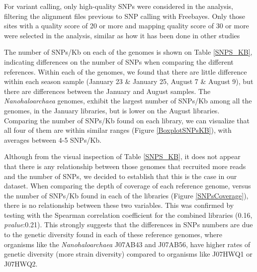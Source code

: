For variant calling, only high-quality SNPs were considered in the analysis, filtering the alignment files previous to SNP calling with Freebayes. Only those sites with a quality score of 20 or more and mapping quality score of 30 or more were selected in the analysis, similar as how it has been done in other studies \cite{Schloissnig:2012hx}

The number of SNPs/Kb on each of the genomes is shown on Table \ref{SNPS_KB}, indicating differences on the number of SNPs when comparing the different references. Within each of the genomes, we found that there are little difference within each season sample (January 23 \& January 25, August 7 \& August 9), but there are differences between the January and August samples. The \textit{Nanohaloarchaea} genomes, exhibit the largest number of SNPs/Kb among all the genomes, in the January libraries, but is lower on the August libraries. Comparing the number of SNPs/Kb found on each library, we can visualize that all four of them are within similar ranges (Figure \ref{BoxplotSNPsKB}), with averages between 4-5 SNPs/Kb.

Although from the visual inspection of Table \ref{SNPS_KB}, it does not appear that there is any relationship between those genomes that recruited more reads and the number of SNPs, we decided to establish that this is the case in our dataset. When comparing the depth of coverage of each reference genome, versus the number of SNPs/Kb found in each of the libraries (Figure \ref{SNPsCoverage}), there is no relationship between these two variables. This was confirmed by testing with the Spearman correlation coefficient for the combined libraries (0.16, \textit{pvalue}:0.21). This strongly suggests that the differences in SNPs numbers are due to the genetic diversity found in each of these reference genomes, where organisms like the \textit{Nanohaloarchaea} J07AB43 and J07AB56, have higher rates of genetic diversity (more strain diversity) compared to organisms like J07HWQ1 or J07HWQ2.

